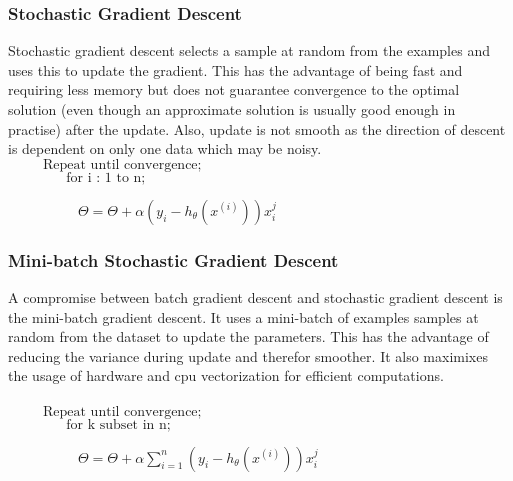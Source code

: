 \documentclass[12pt,a4paper,titlepage,landscape]{book}
\begin{document}
	\subsubsection{Stochastic Gradient Descent}
	Stochastic gradient descent selects a sample at random from the examples and uses this to update the gradient. This has the advantage of being fast and requiring less memory but does not guarantee convergence to the optimal solution (even though an approximate solution is usually good enough in practise) after the update. Also, update is not smooth as the direction of descent is dependent on only one data which may be noisy. \\
	${}\hspace{30pt} \text{Repeat until convergence;} $\\
	${}\hspace{50pt} \text{for i : 1 to n;} $
	
	${}\hspace{60pt} \Theta = \Theta + \alpha\left(y_i - h_\theta(x^{(i)})\right)x_i^j $
	
	\subsubsection{Mini-batch Stochastic Gradient Descent}
	A compromise between batch gradient descent and stochastic gradient descent is the mini-batch gradient descent. It uses a mini-batch of examples samples at random from the dataset  to update the parameters. This has the advantage of reducing the variance during update and therefor smoother. It also maximixes the usage of hardware and cpu vectorization for efficient computations. \\ \\
	${}\hspace{30pt} \text{Repeat until convergence;} $\\
	${}\hspace{50pt} \text{for k subset in n;} $
	 
	${}\hspace{60pt}\Theta = \Theta + \alpha\sum_{i=1}^{n}\left(y_i - h_\theta(x^{(i)})\right)x_i^j $
	 	
\end{document}
